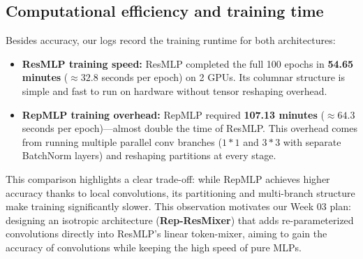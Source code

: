 \subsection{Computational efficiency and training time}
Besides accuracy, our logs record the training runtime for both architectures:
\begin{itemize}[leftmargin=1.5em]
    \item \textbf{ResMLP training speed:} ResMLP completed the full 100 epochs in \textbf{54.65 minutes} ($\approx 32.8$ seconds per epoch) on 2 GPUs. Its columnar structure is simple and fast to run on hardware without tensor reshaping overhead.
    \item \textbf{RepMLP training overhead:} RepMLP required \textbf{107.13 minutes} ($\approx 64.3$ seconds per epoch)---almost double the time of ResMLP. This overhead comes from running multiple parallel conv branches ($1 * 1$ and $3 * 3$ with separate BatchNorm layers) and reshaping partitions at every stage.
\end{itemize}

This comparison highlights a clear trade-off: while RepMLP achieves higher accuracy thanks to local convolutions, its partitioning and multi-branch structure make training significantly slower. This observation motivates our Week 03 plan: designing an isotropic architecture (\textbf{Rep-ResMixer}) that adds re-parameterized convolutions directly into ResMLP's linear token-mixer, aiming to gain the accuracy of convolutions while keeping the high speed of pure MLPs.
